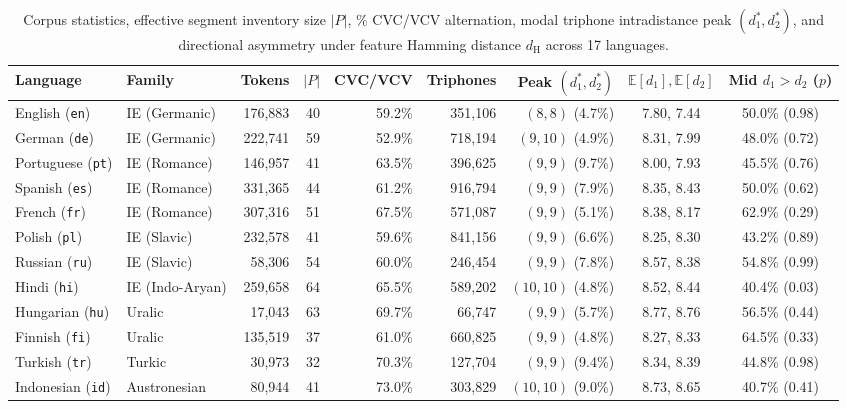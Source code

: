 \documentclass[cm]{glossa}
\begin{document}
\begin{table}[htbp]
\caption{Corpus statistics, effective segment inventory size $|P|$, \% CVC/VCV alternation, modal triphone intradistance peak $(d_1^*, d_2^*)$, and directional asymmetry under feature Hamming distance $d_{\text{H}}$ across 17 languages.}
\centering\scriptsize\setlength{\tabcolsep}{2.2pt}
\begin{tabular}{llrrrrrcc}
\toprule
Language & Family & Tokens & $|P|$ & CVC/VCV & Triphones & Peak $(d_1^*, d_2^*)$ & $\mathbb{E}[d_1], \mathbb{E}[d_2]$ & Mid $d_1>d_2$ ($p$) \\
\midrule
English (\texttt{en})    & IE (Germanic)    & 176,883 & 40 & 59.2\% & 351,106 & $(8,8)$ (4.7\%)   & 7.80, 7.44 & 50.0\% (0.98) \\
German (\texttt{de})     & IE (Germanic)    & 222,741 & 59 & 52.9\% & 718,194 & $(9,10)$ (4.9\%)  & 8.31, 7.99 & 48.0\% (0.72) \\
Portuguese (\texttt{pt}) & IE (Romance)     & 146,957 & 41 & 63.5\% & 396,625 & $(9,9)$ (9.7\%)   & 8.00, 7.93 & 45.5\% (0.76) \\
Spanish (\texttt{es})    & IE (Romance)     & 331,365 & 44 & 61.2\% & 916,794 & $(9,9)$ (7.9\%)   & 8.35, 8.43 & 50.0\% (0.62) \\
French (\texttt{fr})     & IE (Romance)     & 307,316 & 51 & 67.5\% & 571,087 & $(9,9)$ (5.1\%)   & 8.38, 8.17 & 62.9\% (0.29) \\
Polish (\texttt{pl})     & IE (Slavic)      & 232,578 & 41 & 59.6\% & 841,156 & $(9,9)$ (6.6\%)   & 8.25, 8.30 & 43.2\% (0.89) \\
Russian (\texttt{ru})    & IE (Slavic)      &  58,306 & 54 & 60.0\% & 246,454 & $(9,9)$ (7.8\%)   & 8.57, 8.38 & 54.8\% (0.99) \\
Hindi (\texttt{hi})      & IE (Indo-Aryan)  & 259,658 & 64 & 65.5\% & 589,202 & $(10,10)$ (4.8\%) & 8.52, 8.44 & 40.4\% (0.03) \\
Hungarian (\texttt{hu})  & Uralic           &  17,043 & 63 & 69.7\% &  66,747 & $(9,9)$ (5.7\%)   & 8.77, 8.76 & 56.5\% (0.44) \\
Finnish (\texttt{fi})    & Uralic           & 135,519 & 37 & 61.0\% & 660,825 & $(9,9)$ (4.8\%)   & 8.27, 8.33 & 64.5\% (0.33) \\
Turkish (\texttt{tr})    & Turkic           &  30,973 & 32 & 70.3\% & 127,704 & $(9,9)$ (9.4\%)   & 8.34, 8.39 & 44.8\% (0.98) \\
Indonesian (\texttt{id}) & Austronesian     &  80,944 & 41 & 73.0\% & 303,829 & $(10,10)$ (9.0\%) & 8.73, 8.65 & 40.7\% (0.41) \\

\end{tabular}
\end{table}
\end{document}
